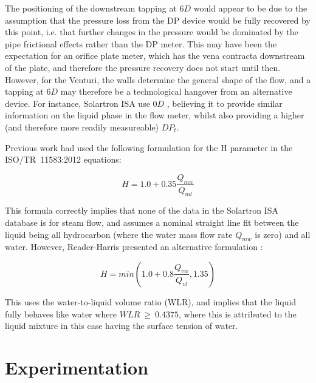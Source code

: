 \documentclass[journal]{IEEEtran}
\begin{document}
The positioning of the downstream tapping at $6D$ would appear to be due to the assumption that the pressure loss from the DP device would be fully recovered by this point, i.e. that further changes in the pressure would be dominated by the pipe frictional effects rather than the DP meter.  This may have been the expectation for an orifice plate meter, which has the vena contracta downstream of the plate, and therefore the pressure recovery does not start until then.  However, for the Venturi, the walls determine the general shape of the flow, and a tapping at $6D$ may therefore be a technological hangover from an alternative device.  For instance, Solartron ISA use $0D$ \cite{Collins2017PLR1}, believing it to provide similar information on the liquid phase in the flow meter, whilst also providing a higher (and therefore more readily measureable) $DP_{t}$.


Previous work \cite{Collins2015} had used the following formulation for the \acrshort{H} parameter in the ISO/TR~11583:2012  \cite{2012ISO/TRConduits} equations:

\begin{equation}
H = 1.0 + 0.35 \frac{Q_{mw}}{Q_{ml}}    
\end{equation}

This formula correctly implies that none of the data in the Solartron ISA database is for steam flow, and assumes a nominal straight line fit between the liquid being all hydrocarbon (where the water mass flow rate $Q_{mw}$ is zero) and all water.  However, Reader-Harris presented an alternative formulation \cite{Reader-Harris2017}:

\begin{equation}
H = min \left( 1.0 + 0.8 \frac{Q_{vw}}{Q_{vl}}, 1.35 \right)    
\end{equation}

This uses the water-to-liquid volume ratio (WLR), and implies that the liquid fully behaves like water where $WLR~\geq~0.4375$, where this is attributed to the liquid mixture in this case having the surface tension of water.


\section{Experimentation}
\end{document}
